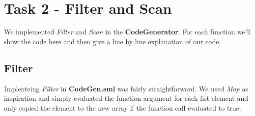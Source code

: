 \documentclass{article}
\begin{document}
\newpage

\section{Task 2 - Filter and Scan}

We implemented \textit{Filter} and \textit{Scan} in the \textbf{CodeGenerator}. For each function we'll show the code here and then give a line by line explanation of our code.

\subsection{Filter}
Implenteing \textit{Filter} in \textbf{CodeGen.sml} was fairly straightforward. We used \textit{Map} as inspiration and simply evaluated the function argument for each list element and only copied the element to the new array if the function call evaluated to true.\\
\end{document}
